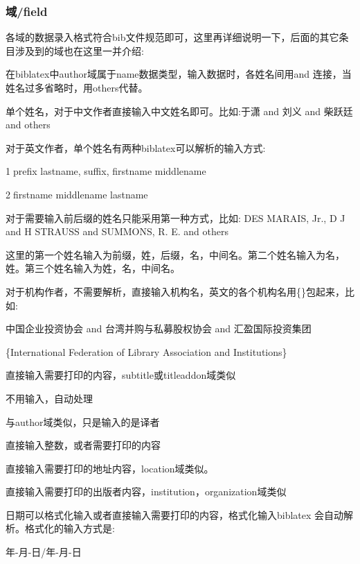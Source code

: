 \documentclass[11pt]{article} %
\begin{document}
\subsubsection{域/field}
各域的数据录入格式符合bib文件规范即可，这里再详细说明一下，后面的其它条目涉及到的域也在这里一并介绍:
\begin{description}[topsep=5pt,partopsep=0pt,parsep=0pt,%
itemsep=0pt,leftmargin=2.2cm,rightmargin=0.5cm,labelwidth=2cm]
  \item[author] 在biblatex中author域属于name数据类型，输入数据时，各姓名间用and 连接，当姓名过多省略时，用others代替。

      单个姓名，对于中文作者直接输入中文姓名即可。比如:于潇 and 刘义 and 柴跃廷 and others

      对于英文作者，单个姓名有两种biblatex可以解析的输入方式:

      \textcircled{1}prefix lastname, suffix, firstname middlename

      \textcircled{2}firstname middlename lastname

      对于需要输入前后缀的姓名只能采用第一种方式，比如:
      DES MARAIS, Jr., D J and H STRAUSS and SUMMONS, R. E. and others

      这里的第一个姓名输入为前缀，姓，后缀，名，中间名。第二个姓名输入为名，姓。第三个姓名输入为姓，名，中间名。

      对于机构作者，不需要解析，直接输入机构名，英文的各个机构名用\{\}包起来，比如:

      中国企业投资协会 and 台湾并购与私募股权协会 and 汇盈国际投资集团

      \{International Federation of Library Association and Institutions\}

  \item[title] 直接输入需要打印的内容，subtitle或titleaddon域类似
  \item[usera] 不用输入，自动处理
  \item[translator] 与author域类似，只是输入的是译者
  \item[edition] 直接输入整数，或者需要打印的内容
  \item[address] 直接输入需要打印的地址内容，location域类似。
  \item[publisher] 直接输入需要打印的出版者内容，institution，organization域类似
  \item[date] 日期可以格式化输入或者直接输入需要打印的内容，格式化输入biblatex 会自动解析。格式化的输入方式是:

      年-月-日/年-月-日


\end{description}
\end{document}
